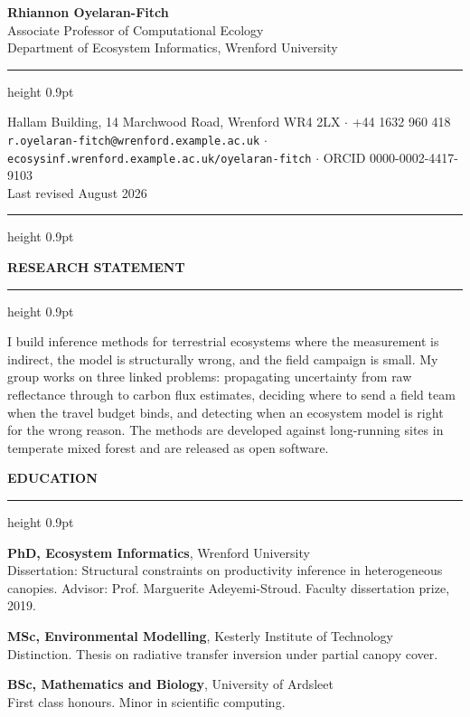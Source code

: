 \documentclass[10pt,a4paper]{article}
\newcommand{\cvsection}[1]{%
  \vspace{10pt}%
  {\normalsize\bfseries\MakeUppercase{#1}}%
  \vspace{2pt}\hrule height 0.9pt%
  \vspace{6pt}%
}
\newenvironment{dated}[1][2.4cm]{%
  \begin{list}{}{%
    \setlength{\labelwidth}{#1}%
    \setlength{\leftmargin}{\dimexpr#1+0.5cm\relax}%
    \setlength{\labelsep}{0.5cm}%
    \setlength{\itemsep}{4pt}%
    \setlength{\parsep}{2pt}%
    \setlength{\topsep}{2pt}%
    \renewcommand{\makelabel}[1]{\small##1\hfill}%
  }%
}{\end{list}}
\newcommand{\role}[2]{\textbf{#1}, #2}
\begin{document}
\begin{center}
  {\LARGE\bfseries Rhiannon Oyelaran-Fitch}\\[4pt]
  {\small Associate Professor of Computational Ecology}\\[2pt]
  {\small Department of Ecosystem Informatics, Wrenford University}
\end{center}

\vspace{4pt}
\hrule height 0.9pt
\vspace{4pt}

\begin{center}\small
  Hallam Building, 14 Marchwood Road, Wrenford WR4 2LX
  \quad$\cdot$\quad
  +44 1632 960 418\\[2pt]
  \texttt{r.oyelaran-fitch@wrenford.example.ac.uk}
  \quad$\cdot$\quad
  \texttt{ecosysinf.wrenford.example.ac.uk/oyelaran-fitch}
  \quad$\cdot$\quad
  ORCID 0000-0002-4417-9103\\[2pt]
  {\footnotesize Last revised August 2026}
\end{center}

\vspace{2pt}
\hrule height 0.9pt

\cvsection{Research statement}

I build inference methods for terrestrial ecosystems where the measurement is indirect, the model
is structurally wrong, and the field campaign is small. My group works on three linked problems:
propagating uncertainty from raw reflectance through to carbon flux estimates, deciding where to
send a field team when the travel budget binds, and detecting when an ecosystem model is right for
the wrong reason. The methods are developed against long-running sites in temperate mixed forest
and are released as open software.

\cvsection{Education}

\begin{dated}
  \item[2015 -- 2019] \role{PhD, Ecosystem Informatics}{Wrenford University}\\
    \small Dissertation: Structural constraints on productivity inference in heterogeneous
    canopies. Advisor: Prof. Marguerite Adeyemi-Stroud. Faculty dissertation prize, 2019.
  \item[2013 -- 2015] \role{MSc, Environmental Modelling}{Kesterly Institute of Technology}\\
    \small Distinction. Thesis on radiative transfer inversion under partial canopy cover.
  \item[2010 -- 2013] \role{BSc, Mathematics and Biology}{University of Ardsleet}\\
    \small First class honours. Minor in scientific computing.
\end{dated}
\end{document}
